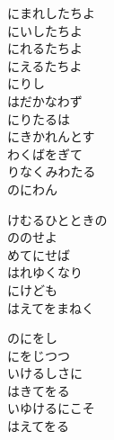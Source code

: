 \documentclass[10pt,b5j]{tarticle} %
\begin{document}
\vspace{1.5em} %
\newcommand{\linespace}{0.5em} %
\newcommand{\blocksize}{0.5\hsize} %
\begin{enumerate} %
    \begin{minipage}[c]{\blocksize}
    
        \vspace{\linespace}
        \item
        にまれしたちよ\\
        にいしたちよ\\
        にれるたちよ\\
        にえるたちよ\\
        にりし\\
        はだかなわず\\
        にりたるは\\
        にきかれんとす\\
        わくばをぎて\\
        りなくみわたる\\
        のにわん
        
        \vspace{\linespace}
        \item
        けむるひとときの\\
        ののせよ\\
        めてにせば\\
        はれゆくなり\\
        にけども\\
        はえてをまねく
        
        \vspace{\linespace}
        \item
        のにをし\\
        にをじつつ\\
        いけるしさに\\
        はきてをる\\
        いゆけるにこそ\\
        はえてをる
        

\end{minipage}
\end{enumerate}
\end{document}
